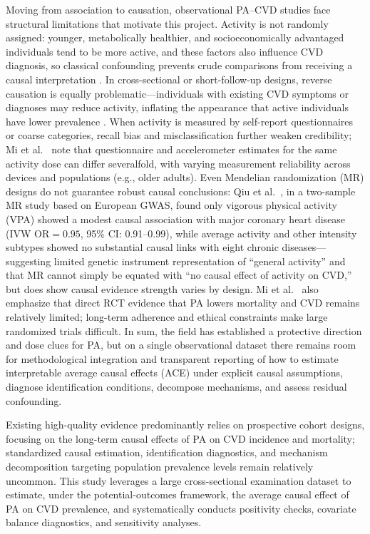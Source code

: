 \documentclass[12pt,a4paper]{article}
\begin{document}
Moving from association to causation, observational PA--CVD studies face structural limitations that motivate this project. Activity is not randomly assigned: younger, metabolically healthier, and socioeconomically advantaged individuals tend to be more active, and these factors also influence CVD diagnosis, so classical confounding prevents crude comparisons from receiving a causal interpretation \cite{mi2025creview,hernan2024whatif}. In cross-sectional or short-follow-up designs, reverse causation is equally problematic---individuals with existing CVD symptoms or diagnoses may reduce activity, inflating the appearance that active individuals have lower prevalence \cite{mi2025creview}. When activity is measured by self-report questionnaires or coarse categories, recall bias and misclassification further weaken credibility; Mi et al.\ \cite{mi2025creview} note that questionnaire and accelerometer estimates for the same activity dose can differ severalfold, with varying measurement reliability across devices and populations (e.g., older adults). Even Mendelian randomization (MR) designs do not guarantee robust causal conclusions: Qiu et al.\ \cite{qiu2025mr}, in a two-sample MR study based on European GWAS, found only vigorous physical activity (VPA) showed a modest causal association with major coronary heart disease (IVW OR$=0.95$, 95\% CI: 0.91--0.99), while average activity and other intensity subtypes showed no substantial causal links with eight chronic diseases---suggesting limited genetic instrument representation of ``general activity'' and that MR cannot simply be equated with ``no causal effect of activity on CVD,'' but does show causal evidence strength varies by design. Mi et al.\ \cite{mi2025creview} also emphasize that direct RCT evidence that PA lowers mortality and CVD remains relatively limited; long-term adherence and ethical constraints make large randomized trials difficult. In sum, the field has established a protective direction and dose clues for PA, but on a single observational dataset there remains room for methodological integration and transparent reporting of how to estimate interpretable average causal effects (ACE) under explicit causal assumptions, diagnose identification conditions, decompose mechanisms, and assess residual confounding.

Existing high-quality evidence predominantly relies on prospective cohort designs, focusing on the long-term causal effects of PA on CVD incidence and mortality; standardized causal estimation, identification diagnostics, and mechanism decomposition targeting population prevalence levels remain relatively uncommon. This study leverages a large cross-sectional examination dataset to estimate, under the potential-outcomes framework, the average causal effect of PA on CVD prevalence, and systematically conducts positivity checks, covariate balance diagnostics, and sensitivity analyses.
\end{document}
